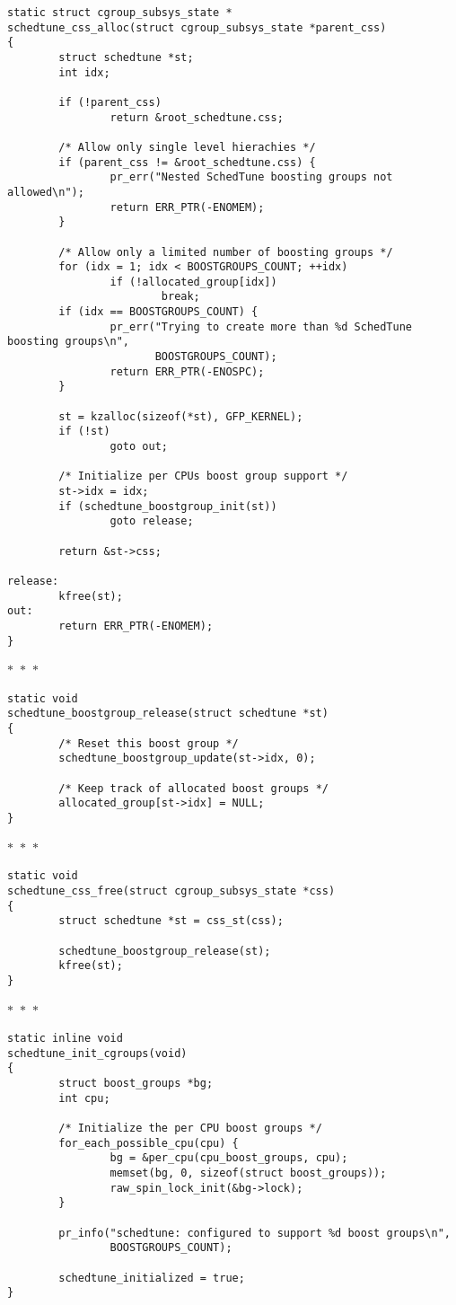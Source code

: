 \documentclass{article}
\newcommand{\divider}{{\begin{center}
  $\ast$~$\ast$~$\ast$
\end{center}}}
\begin{document}
\begin{verbatim}
static struct cgroup_subsys_state *
schedtune_css_alloc(struct cgroup_subsys_state *parent_css)
{
        struct schedtune *st;
        int idx;

        if (!parent_css)
                return &root_schedtune.css;

        /* Allow only single level hierachies */
        if (parent_css != &root_schedtune.css) {
                pr_err("Nested SchedTune boosting groups not allowed\n");
                return ERR_PTR(-ENOMEM);
        }

        /* Allow only a limited number of boosting groups */
        for (idx = 1; idx < BOOSTGROUPS_COUNT; ++idx)
                if (!allocated_group[idx])
                        break;
        if (idx == BOOSTGROUPS_COUNT) {
                pr_err("Trying to create more than %d SchedTune boosting groups\n",
                       BOOSTGROUPS_COUNT);
                return ERR_PTR(-ENOSPC);
        }

        st = kzalloc(sizeof(*st), GFP_KERNEL);
        if (!st)
                goto out;

        /* Initialize per CPUs boost group support */
        st->idx = idx;
        if (schedtune_boostgroup_init(st))
                goto release;

        return &st->css;

release:
        kfree(st);
out:
        return ERR_PTR(-ENOMEM);
}
\end{verbatim}
\divider
\begin{verbatim}
static void
schedtune_boostgroup_release(struct schedtune *st)
{
        /* Reset this boost group */
        schedtune_boostgroup_update(st->idx, 0);

        /* Keep track of allocated boost groups */
        allocated_group[st->idx] = NULL;
}
\end{verbatim}
\divider
\begin{verbatim}
static void
schedtune_css_free(struct cgroup_subsys_state *css)
{
        struct schedtune *st = css_st(css);

        schedtune_boostgroup_release(st);
        kfree(st);
}
\end{verbatim}
\divider
\begin{verbatim}
static inline void
schedtune_init_cgroups(void)
{
        struct boost_groups *bg;
        int cpu;

        /* Initialize the per CPU boost groups */
        for_each_possible_cpu(cpu) {
                bg = &per_cpu(cpu_boost_groups, cpu);
                memset(bg, 0, sizeof(struct boost_groups));
                raw_spin_lock_init(&bg->lock);
        }

        pr_info("schedtune: configured to support %d boost groups\n",
                BOOSTGROUPS_COUNT);

        schedtune_initialized = true;
}
\end{verbatim}
\end{document}
